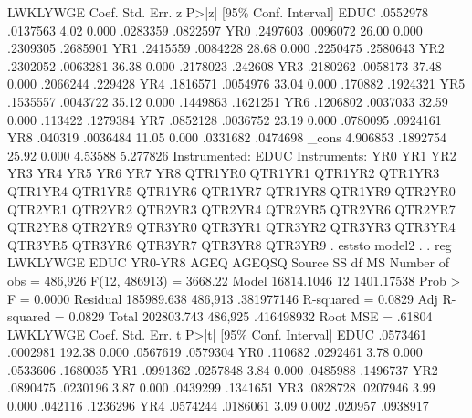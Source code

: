 {\smallskip}
    LWKLYWGE {\VBAR}      Coef.   Std. Err.      z    P>|z|     [95\% Conf. Interval]
        EDUC {\VBAR}   .0552978   .0137563     4.02   0.000     .0283359    .0822597
         YR0 {\VBAR}   .2497603   .0096072    26.00   0.000     .2309305    .2685901
         YR1 {\VBAR}   .2415559   .0084228    28.68   0.000     .2250475    .2580643
         YR2 {\VBAR}   .2302052   .0063281    36.38   0.000     .2178023     .242608
         YR3 {\VBAR}   .2180262   .0058173    37.48   0.000     .2066244     .229428
         YR4 {\VBAR}   .1816571   .0054976    33.04   0.000      .170882    .1924321
         YR5 {\VBAR}   .1535557   .0043722    35.12   0.000     .1449863    .1621251
         YR6 {\VBAR}   .1206802   .0037033    32.59   0.000      .113422    .1279384
         YR7 {\VBAR}   .0852128   .0036752    23.19   0.000     .0780095    .0924161
         YR8 {\VBAR}    .040319   .0036484    11.05   0.000     .0331682    .0474698
       _cons {\VBAR}   4.906853   .1892754    25.92   0.000      4.53588    5.277826
Instrumented:  EDUC
Instruments:   YR0 YR1 YR2 YR3 YR4 YR5 YR6 YR7 YR8 QTR1YR0 QTR1YR1 QTR1YR2
               QTR1YR3 QTR1YR4 QTR1YR5 QTR1YR6 QTR1YR7 QTR1YR8 QTR1YR9
               QTR2YR0 QTR2YR1 QTR2YR2 QTR2YR3 QTR2YR4 QTR2YR5 QTR2YR6
               QTR2YR7 QTR2YR8 QTR2YR9 QTR3YR0 QTR3YR1 QTR3YR2 QTR3YR3
               QTR3YR4 QTR3YR5 QTR3YR6 QTR3YR7 QTR3YR8 QTR3YR9
{\smallskip}
. eststo model2
{\smallskip}
. 
. reg  LWKLYWGE EDUC  YR0-YR8 AGEQ AGEQSQ 
{\smallskip}
      Source {\VBAR}       SS           df       MS      Number of obs   =   486,926
   F(12, 486913)   =   3668.22
       Model {\VBAR}  16814.1046        12  1401.17538   Prob > F        =    0.0000
    Residual {\VBAR}  185989.638   486,913  .381977146   R-squared       =    0.0829
   Adj R-squared   =    0.0829
       Total {\VBAR}  202803.743   486,925  .416498932   Root MSE        =    .61804
{\smallskip}
    LWKLYWGE {\VBAR}      Coef.   Std. Err.      t    P>|t|     [95\% Conf. Interval]
        EDUC {\VBAR}   .0573461   .0002981   192.38   0.000     .0567619    .0579304
         YR0 {\VBAR}    .110682   .0292461     3.78   0.000     .0533606    .1680035
         YR1 {\VBAR}   .0991362   .0257848     3.84   0.000     .0485988    .1496737
         YR2 {\VBAR}   .0890475   .0230196     3.87   0.000     .0439299    .1341651
         YR3 {\VBAR}   .0828728   .0207946     3.99   0.000      .042116    .1236296
         YR4 {\VBAR}   .0574244   .0186061     3.09   0.002      .020957    .0938917
